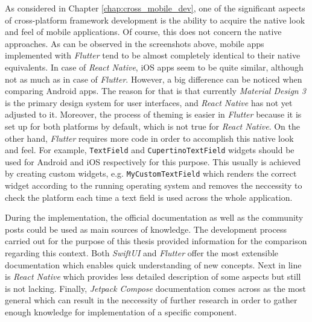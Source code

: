 As considered in Chapter \ref{chap:cross_mobile_dev}, one of the significant aspects of cross-platform framework development is the ability to acquire the native look and feel of mobile applications. Of course, this does not concern the native approaches. As can be observed in the screenshots above, mobile apps implemented with \emph{Flutter} tend to be almost completely identical to their native equivalents. In case of \emph{React Native}, iOS apps seem to be quite similar, although not as much as in case of \emph{Flutter}. However, a big difference can be noticed when comparing Android apps. The reason for that is that currently \emph{Material Design 3} is the primary design system for user interfaces, and \emph{React Native} has not yet adjusted to it. Moreover, the process of theming is easier in \emph{Flutter} because it is set up for both platforms by default, which is not true for \emph{React Native}. On the other hand, \emph{Flutter} requires more code in order to accomplish this native look and feel. For example, \texttt{TextField} and \texttt{CupertinoTextField} widgets should be used for Android and iOS respectively for this purpose. This usually is achieved by creating custom widgets, e.g. \texttt{MyCustomTextField} which renders the correct widget according to the running operating system and removes the neccessity to check the platform each time a text field is used across the whole application.

During the implementation, the official documentation as well as the community posts could be used as main sources of knowledge. The development process carried out for the purpose of this thesis provided information for the comparison regarding this context. Both \emph{SwiftUI} and \emph{Flutter} offer the most extensible documentation which enables quick understanding of new concepts. Next in line is \emph{React Native} which provides less detailed description of some aspects but still is not lacking. Finally, \emph{Jetpack Compose} documentation comes across as the most general which can result in the neccessity of further research in order to gather enough knowledge for implementation of a specific component.

\clearpage
